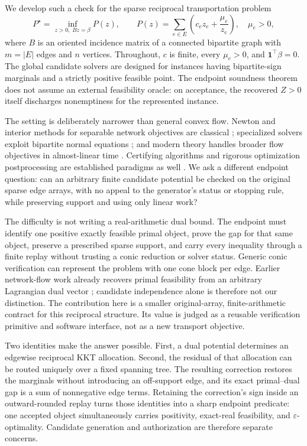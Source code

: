 \documentclass[smallextended,envcountsect]{svjour3}
\newcommand{\one}{\mathbf{1}}
\begin{document}
We develop such a check for the sparse reciprocal transportation problem
\begin{equation}
 P^\star=\inf_{z>0,\;Bz=\beta}P(z),\qquad
 P(z)=\sum_{e\in E}\left(c_ez_e+\frac{\mu_e}{z_e}\right),
 \quad \mu_e>0,
 \label{eq:problem}
\end{equation}
where $B$ is an oriented incidence matrix of a connected bipartite graph with
$m=|E|$ edges and $n$ vertices.  Throughout, $c$ is finite, every
$\mu_e>0$, and $\one^\top\beta=0$.  The global candidate solvers are designed
for instances having bipartite-sign marginals and a strictly positive feasible
point.  The endpoint soundness theorem does not assume an external feasibility
oracle: on acceptance, the recovered $Z>0$ itself discharges nonemptiness for
the represented instance.

The setting is deliberately narrower than general convex flow.  Newton and
interior methods for separable network objectives are classical
\citep{klincewicz1983,klincewicz1989}; specialized solvers exploit bipartite
normal equations \citep{castro2021huge,wright2023direct}; and modern theory
handles broader flow objectives in almost-linear time
\citep{chen2025maxflow}.  Certifying algorithms and rigorous optimization
postprocessing are established paradigms as well
\citep{mcconnell2011certifying,jansson2004convex,jansson2007rigorous}.  We ask a
different endpoint question: can an arbitrary finite candidate potential be
checked on the original sparse edge arrays, with no appeal to the generator's
status or stopping rule, while preserving support and using only linear work?

The difficulty is not writing a real-arithmetic dual bound.  The endpoint must
identify one positive exactly feasible primal object, prove the gap for that
same object, preserve a prescribed sparse support, and carry every inequality
through a finite replay without trusting a conic reduction or solver status.
Generic conic verification can represent the problem with one cone block per
edge. Earlier network-flow work already recovers primal feasibility from an
arbitrary Lagrangian dual vector \citep{marklund2008early}; candidate independence
alone is therefore not our distinction. The contribution here is a smaller
original-array, finite-arithmetic contract for this reciprocal structure. Its value is judged
as a reusable verification primitive and software interface, not as a new
transport objective.

Two identities make the answer possible.  First, a dual potential determines
an edgewise reciprocal KKT allocation.  Second, the residual of that allocation
can be routed uniquely over a fixed spanning tree.  The resulting correction
restores the marginals without introducing an off-support edge, and its exact
primal--dual gap is a sum of nonnegative edge terms.  Retaining the correction's
sign inside an outward-rounded replay turns those identities into a sharp
endpoint predicate: one accepted object simultaneously carries positivity,
exact-real feasibility, and $\varepsilon$-optimality.  Candidate generation and
authorization are therefore separate concerns.
\end{document}
